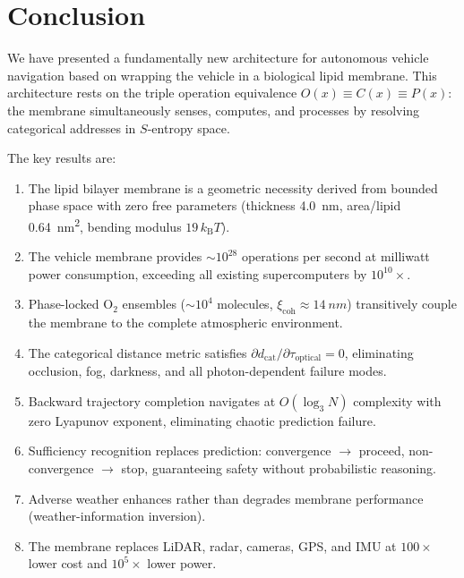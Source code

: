 \documentclass[twocolumn,10pt]{article}
\theoremstyle{definition}
\theoremstyle{remark}
\newcommand{\kB}{k_{\mathrm{B}}}
\newcommand{\dcat}{d_{\mathrm{cat}}}
\newcommand{\xicoh}{\xi_{\mathrm{coh}}}
\begin{document}
\section{Conclusion}
\label{sec:conclusion}

We have presented a fundamentally new architecture for autonomous vehicle navigation based on wrapping the vehicle in a biological lipid membrane. This architecture rests on the triple operation equivalence $O(x) \equiv C(x) \equiv P(x)$: the membrane simultaneously senses, computes, and processes by resolving categorical addresses in $S$-entropy space.

The key results are:

\begin{enumerate}[label=(\roman*)]
  \item The lipid bilayer membrane is a geometric necessity derived from bounded phase space with zero free parameters (thickness \SI{4.0}{nm}, area/lipid \SI{0.64}{nm^2}, bending modulus $19\,\kB T$).

  \item The vehicle membrane provides $\sim 10^{28}$ operations per second at milliwatt power consumption, exceeding all existing supercomputers by $10^{10}\times$.

  \item Phase-locked $\mathrm{O}_2$ ensembles ($\sim 10^4$ molecules, $\xicoh \approx \SI{14}{nm}$) transitively couple the membrane to the complete atmospheric environment.

  \item The categorical distance metric satisfies $\partial\dcat/\partial\tau_{\mathrm{optical}} = 0$, eliminating occlusion, fog, darkness, and all photon-dependent failure modes.

  \item Backward trajectory completion navigates at $O(\log_3 N)$ complexity with zero Lyapunov exponent, eliminating chaotic prediction failure.

  \item Sufficiency recognition replaces prediction: convergence $\to$ proceed, non-convergence $\to$ stop, guaranteeing safety without probabilistic reasoning.

  \item Adverse weather enhances rather than degrades membrane performance (weather-information inversion).

  \item The membrane replaces LiDAR, radar, cameras, GPS, and IMU at $100\times$ lower cost and $10^5\times$ lower power.
\end{enumerate}
\end{document}
